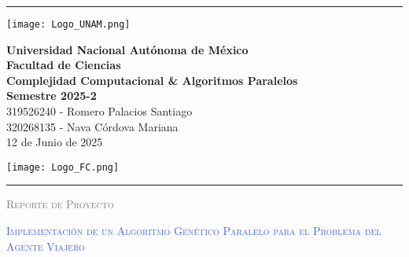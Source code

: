 \documentclass{article}
\renewcommand{\TituloMain}[0]{Reporte de Proyecto}
\newcommand{\SubtituloMain}[0]{Implementación de un Algoritmo Genético Paralelo para el Problema del Agente Viajero}
\newcommand{\MateriaMain}[0]{Complejidad Computacional \& Algoritmos Paralelos}
\newcommand{\FechaMain}[0]{12 de Junio de 2025}
\begin{document}
           \begin{titlepage}
    \begin{centering}

        \thispagestyle{empty}
        
        \setlength{\parindent}{0cm}
        
        \rule{\linewidth}{0.1mm}
        \begin{center}
            \begin{minipage}{2.5cm}
                \begin{center}
                \texttt{[image: Logo\_UNAM.png]}
                \end{center}
            \end{minipage}\hfill
            \begin{minipage}{10cm}
                \begin{center}
                \textbf{ Universidad Nacional Autónoma de México}\\[0.1cm]
                \textbf{Facultad de Ciencias}\\[0.1cm]
                \textbf{\MateriaMain}\\[0.1cm]
                \textbf{Semestre 2025-2}\\[0.1cm]
                319526240 - Romero Palacios Santiago\\[0.1cm]
                320268135 - Nava Córdova Mariana\\[0.1cm]
                \FechaMain
                \end{center}
            \end{minipage}\hfill
            \begin{minipage}{2.5cm}
                \begin{center}
                \texttt{[image: Logo\_FC.png]}
                \end{center}
            \end{minipage}
        \end{center}
        \rule{\linewidth}{0.1mm}
        
        \date{}
        \vspace{0.5cm}
        \vspace{0.5cm}
            {\scshape\LARGE \textcolor{Gray}{\TituloMain} \par}
            {\scshape\Huge \textcolor{RoyalBlue}{\SubtituloMain} \par}
            {
                \vspace*{2mm}
                \begin{center}\begin{minipage}{6.5cm}
                \centering \tableofcontents
                \end{minipage}\end{center}
            }
        \vspace{0.5cm}


\end{centering}
\end{titlepage}
\end{document}
